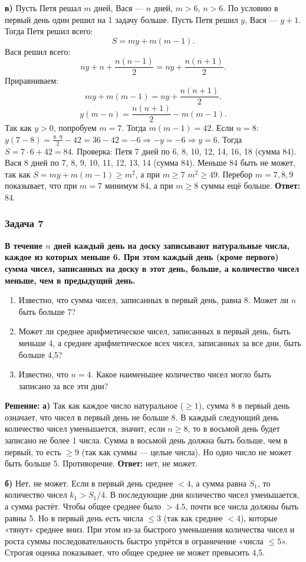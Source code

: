 \documentclass[12pt, a4paper]{article}
\begin{document}
\textbf{в)} Пусть Петя решал $m$ дней, Вася — $n$ дней, $m > 6$, $n > 6$. По условию в первый день один решил на 1 задачу больше. Пусть Петя решил $y$, Вася — $y+1$.
Тогда Петя решил всего:
\[
S = my + m(m-1).
\]
Вася решил всего:
\[
ny + n + \frac{n(n-1)}{2} = ny + \frac{n(n+1)}{2}.
\]
Приравниваем:
\[
my + m(m-1) = ny + \frac{n(n+1)}{2}.
\]
\[
y(m-n) = \frac{n(n+1)}{2} - m(m-1).
\]
Так как $y > 0$, попробуем $m=7$. Тогда $m(m-1) = 42$.
Если $n=8$: $y(7-8) = \frac{8 \cdot 9}{2} - 42 = 36 - 42 = -6 \Rightarrow -y = -6 \Rightarrow y = 6$.
Тогда $S = 7 \cdot 6 + 42 = 84$.
Проверка: Петя 7 дней по 6, 8, 10, 12, 14, 16, 18 (сумма 84). Вася 8 дней по 7, 8, 9, 10, 11, 12, 13, 14 (сумма 84).
Меньше 84 быть не может, так как $S = my + m(m-1) \ge m^2$, а при $m \ge 7$ $m^2 \ge 49$. Перебор $m=7,8,9$ показывает, что при $m=7$ минимум 84, а при $m \ge 8$ суммы ещё больше.
\textbf{Ответ:} 84.

\subsubsection*{Задача 7}
\textbf{В течение $n$ дней каждый день на доску записывают натуральные числа, каждое из которых меньше 6. При этом каждый день (кроме первого) сумма чисел, записанных на доску в этот день, больше, а количество чисел меньше, чем в предыдущий день.}
\begin{enumerate}[label=\alph*)]
    \item Известно, что сумма чисел, записанных в первый день, равна 8. Может ли $n$ быть больше 7?
    \item Может ли среднее арифметическое чисел, записанных в первый день, быть меньше 4, а среднее арифметическое всех чисел, записанных за все дни, быть больше 4,5?
    \item Известно, что $n = 4$. Какое наименьшее количество чисел могло быть записано за все эти дни?
\end{enumerate}

\textbf{Решение:}
\textbf{а)} Так как каждое число натуральное ($\ge 1$), сумма 8 в первый день означает, что чисел в первый день не больше 8. В каждый следующий день количество чисел уменьшается, значит, если $n \ge 8$, то в восьмой день будет записано не более 1 числа. Сумма в восьмой день должна быть больше, чем в первый, то есть \(\ge 9\) (так как суммы — целые числа). Но одно число не может быть больше 5. Противоречие.
\textbf{Ответ:} нет, не может.

\textbf{б)} Нет, не может. Если в первый день среднее \(<4\), а сумма равна \(S_1\), то количество чисел \(k_1 > S_1/4\). В последующие дни количество чисел уменьшается, а сумма растёт. Чтобы общее среднее было \(>4.5\), почти все числа должны быть равны 5. Но в первый день есть числа \(\le 3\) (так как среднее \(<4\)), которые «тянут» среднее вниз. При этом из-за быстрого уменьшения количества чисел и роста суммы последовательность быстро упрётся в ограничение «числа \(\le 5\)». Строгая оценка показывает, что общее среднее не может превысить 4,5.
\end{document}
